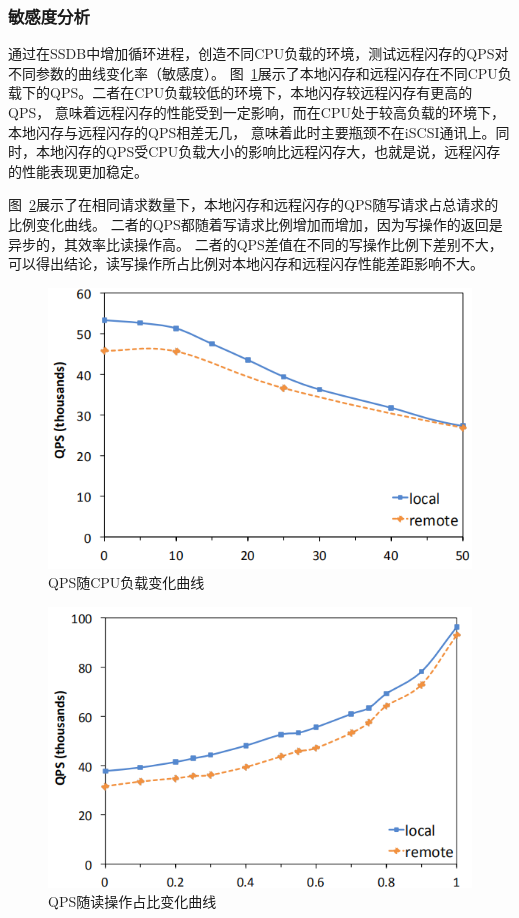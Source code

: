 \subsubsection{敏感度分析}
通过在SSDB中增加循环进程，创造不同CPU负载的环境，测试远程闪存的QPS对不同参数的曲线变化率（敏感度）。
图~\ref{fig:QPS_CPUintensity}展示了本地闪存和远程闪存在不同CPU负载下的QPS。二者在CPU负载较低的环境下，本地闪存较远程闪存有更高的QPS，
意味着远程闪存的性能受到一定影响，而在CPU处于较高负载的环境下，本地闪存与远程闪存的QPS相差无几，
意味着此时主要瓶颈不在iSCSI通讯上。同时，本地闪存的QPS受CPU负载大小的影响比远程闪存大，也就是说，远程闪存的性能表现更加稳定。


图~\ref{fig:QPS_percentage}展示了在相同请求数量下，本地闪存和远程闪存的QPS随写请求占总请求的比例变化曲线。
二者的QPS都随着写请求比例增加而增加，因为写操作的返回是异步的，其效率比读操作高。
二者的QPS差值在不同的写操作比例下差别不大，可以得出结论，读写操作所占比例对本地闪存和远程闪存性能差距影响不大。

\begin{figure}
\centering
\includegraphics[scale=0.8]{Figures/storage/QPS_CPUintensity.jpg}
\decoRule
\caption{QPS随CPU负载变化曲线}
\label{fig:QPS_CPUintensity}
\end{figure}

\begin{figure}
\centering
\includegraphics[scale=0.8]{Figures/storage/QPS_percentage.jpg}
\decoRule
\caption{QPS随读操作占比变化曲线}
\label{fig:QPS_percentage}
\end{figure}

